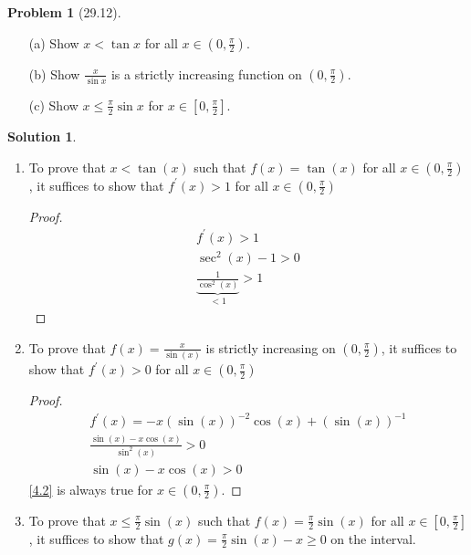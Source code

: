 \documentclass[12pt]{article}
\theoremstyle{definition} %
\newtheorem{solution}{Solution}
\newtheorem{problem}{Problem}
\theoremstyle{plain} %
\begin{document}
\begin{problem}[29.12]
    \noindent

    \begin{enumerate}
        \item[(a)] Show $ x < \tan x $ for all $ x \in \left( 0, \frac{\pi}{2} \right) $.
        \item[(b)] Show $ \frac{x}{\sin x} $ is a strictly increasing function on $ \left( 0, \frac{\pi}{2} \right) $.
        \item[(c)] Show $ x \leq \frac{\pi}{2} \sin x $ for $ x \in \left[ 0, \frac{\pi}{2} \right] $.
    \end{enumerate}
\end{problem}
\begin{solution}
    \noindent
\begin{enumerate}
    \item To prove that $x<\tan(x)$ such that $f(x)=\tan(x)$ for all $x \in (0, \frac{\pi}{2})$, it suffices to show that $f^\prime (x)>1$ for all $x\in(0,\frac{\pi}{2})$    \begin{proof}
        \begin{align}
            f^\prime (x)>1 \\[10pt] 
            \sec^{2}(x)-1>0\\[10pt] 
            \underbrace{\frac{1}{\cos^{2}(x)}}_{< 1} >1
        \end{align}
    \end{proof}
    \item To prove that $f(x)=\frac{x}{\sin(x)}$ is strictly increasing on $(0,\frac{\pi}{2})$, it suffices to show that $f^\prime (x)>0$ for all $x\in(0,\frac{\pi}{2})$
    \begin{proof}
        \begin{align}
            f^\prime (x)=-x(\sin(x))^{-2}\cos(x)+(\sin(x))^{-1}\\[10pt] 
            \frac{\sin(x)-x\cos(x)}{\sin^{2}(x)}>0 \\[10pt] 
            \sin(x)-x\cos(x)>0 \label{4.2}
        \end{align}
        \autoref{4.2} is always true for $x\in (0, \frac{\pi}{2})$. 
    \end{proof}
    \item To prove that $x \leq \frac{\pi}{2}\sin(x)$ such that $f(x) = \frac{\pi}{2}\sin(x)$ for all $x \in [0, \frac{\pi}{2}]$, it suffices to show that $g(x) = \frac{\pi}{2}\sin(x) - x \geq 0$ on the interval.  


\end{enumerate}
\end{solution}
\end{document}
